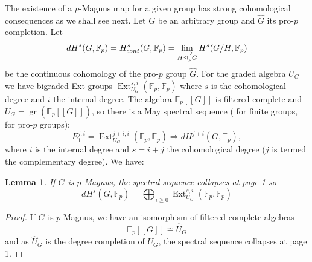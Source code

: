 \documentclass[10pt, oneside]{amsart}
\newcommand{\Z}{\mathbb{Z}} %
\newcommand{\Ext}{\operatorname{Ext}}
\newcommand{\F}{\mathbb{F}}
\newcommand{\gr}{\operatorname{gr}} %
\newtheorem{lemma}[theorem]{Lemma}
\theoremstyle{definition}
\theoremstyle{remark}
\theoremstyle{plain}
\begin{document}

The existence of a $p$-Magnus map for a given group has strong cohomological consequences as we shall see next. 
Let $G$ be an arbitrary group and $\hat{G}$ its pro-$p$ completion. Let
$$dH^s(G,\F_p)=H^s_{cont}(G,\F_p)=\varinjlim_{H\trianglelefteq_pG}H^s(G/H,\F_p)$$
be the continuous cohomology of the pro-$p$ group $\hat{G}$. For the graded algebra $U_G$ we have bigraded Ext groups $\Ext_{U_G}^{s,i}(\F_p,\F_p)$ where $s$ is the cohomological degree and $i$ the internal degree. The algebra $\F_p[[G]]$ is filtered complete and $U_G=\gr(\F_p[[G]])$, so there is a May spectral sequence (\cite{May} for finite groups, \cite[Theorem 5.1.12]{SymondsWeigel} for pro-$p$ groups):
$$E_1^{j,i}=\Ext_{U_G}^{j+i,i}(\F_p,\F_p)\Rightarrow dH^{j+i}(G,\F_p),$$
where $i$ is the internal degree and $s=i+j$ the cohomological degree ($j$ is termed the complementary degree). We have:




\begin{lemma}\label{lem:collapse}
    If $G$ is $p$-Magnus, the spectral sequence collapses at page 1 so
    $$dH^{s}(G,\F_p)=\bigoplus_{i\geq 0}\Ext_{U_G}^{s,i}(\F_p,\F_p)$$
\end{lemma}
\begin{proof} If $G$ is $p$-Magnus, we have an isomorphism of filtered complete algebras 
$$\F_p[[G]]\cong\hat{U}_G$$
and as $\hat{U}_G$ is the degree completion of $U_G$, the spectral sequence collapses at page 1.
\end{proof}
\end{document}
